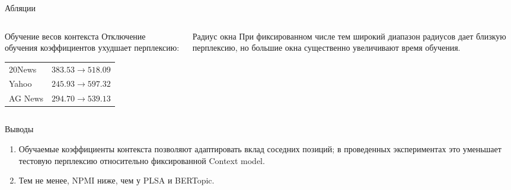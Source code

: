 \documentclass[aspectratio=169]{beamer}
\newcommand{\contextmodel}{Context model}
\newcommand{\plsa}{PLSA}
\newcommand{\bertopic}{BERTopic}
\begin{document}
\begin{frame}{Абляции}
    \begin{columns}[T]
        \begin{column}{0.5\textwidth}
            \begin{block}{Обучение весов контекста}
                Отключение обучения коэффициентов ухудшает перплексию:
                \begin{center}
                \small
                \begin{tabular}{@{}lr@{}}
                    20News & \(383.53\to 518.09\)\\
                    Yahoo & \(245.93\to 597.32\)\\
                    AG News & \(294.70\to 539.13\)
                \end{tabular}
                \end{center}
            \end{block}
            
        \end{column}
        \begin{column}{0.47\textwidth}
            \begin{block}{Радиус окна}
                При фиксированном числе тем широкий диапазон радиусов дает
                близкую перплексию, но большие окна существенно увеличивают
                время обучения.
            \end{block}
            
        \end{column}
    \end{columns}
\end{frame}

\begin{frame}{Выводы}
    \begin{enumerate}
        \item Обучаемые коэффициенты контекста позволяют адаптировать вклад
        соседних позиций; в проведенных экспериментах это уменьшает тестовую
        перплексию относительно фиксированной \contextmodel{}.
        \item Тем не менее, NPMI ниже, чем у \plsa{} и \bertopic{}.
    \end{enumerate}
\end{frame}
\end{document}
